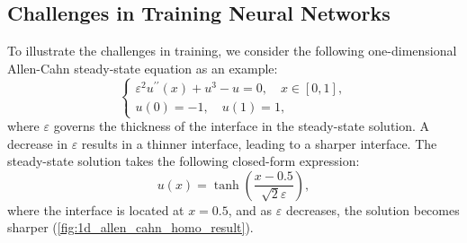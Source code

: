 
\subsection{Challenges in Training Neural Networks}

To illustrate the challenges in training, we consider the following one-dimensional Allen-Cahn steady-state equation as an example:
\begin{equation}
\left\{\begin{array}{l}
\varepsilon^2 u^{\prime \prime}(x) + {u^3 - u}=0, \quad x \in[0,1], \\
u(0)=-1, \quad u(1)=1,
\end{array}\right.
\label{eq:1d_allen_cahn}
\end{equation}
where $\varepsilon$ governs the thickness of the interface in the steady-state solution. 
A decrease in 
$\varepsilon$ results in a thinner interface, leading to a sharper interface. 
The steady-state solution takes the following closed-form expression:\begin{equation}
    u(x) = \tanh\left(\frac{x-0.5}{\sqrt{2}\varepsilon}\right),
\end{equation}
where the interface is located at $x = 0.5$, and as $\varepsilon$ decreases, the solution becomes sharper (\cref{fig:1d_allen_cahn_homo_result}). %

